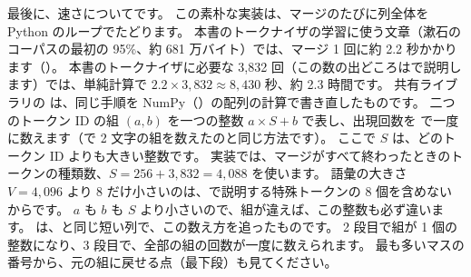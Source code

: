 最後に、速さについてです。
この素朴な実装は、マージのたびに列全体を Python のループでたどります。
本書のトークナイザの学習に使う文章（漱石のコーパスの最初の 95\%、約 681 万バイト）では、マージ 1 回に約 2.2 秒かかります（）。
本書のトークナイザに必要な 3,832 回（この数の出どころはで説明します）では、単純計算で $2.2\times3{,}832\approx8{,}430$ 秒、約 2.3 時間です。
共有ライブラリの  は、同じ手順を NumPy（）の配列の計算で書き直したものです。
二つのトークン ID の組 $(a, b)$ を一つの整数 $a\times S+b$ で表し、出現回数を  で一度に数えます（で 2 文字の組を数えたのと同じ方法です）。
ここで $S$ は、どのトークン ID よりも大きい整数です。
実装では、マージがすべて終わったときのトークンの種類数、$S=256+3{,}832=4{,}088$ を使います。
語彙の大きさ $V=4{,}096$ より 8 だけ小さいのは、で説明する特殊トークンの 8 個を含めないからです。
$a$ も $b$ も $S$ より小さいので、組が違えば、この整数も必ず違います。
は、と同じ短い列で、この数え方を追ったものです。
2 段目で組が 1 個の整数になり、3 段目で、全部の組の回数が一度に数えられます。
最も多いマスの番号から、元の組に戻せる点（最下段）も見てください。

